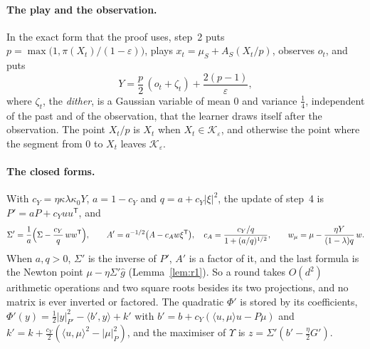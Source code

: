 \documentclass[11pt]{amsart}
\theoremstyle{definition}
\numberwithin{equation}{section}
\newcommand{\cK}{\mathcal{K}}
\newcommand{\ip}[1]{\langle #1\rangle}
\begin{document}
\paragraph{The play and the observation.} In the exact form that the proof uses, step~2 puts $p=\max\bigl(1,\pi(X_t)/(1-\varepsilon)\bigr)$, plays $x_t=\mu_S+A_S(X_t/p)$, observes $o_t$, and puts
\[
Y=\frac p2\,(o_t+\zeta_t)+\frac{2(p-1)}\varepsilon,
\]
where $\zeta_t$, the \emph{dither}, is a Gaussian variable of mean $0$ and variance $\frac14$, independent of the past and of the observation, that the learner draws itself after the observation. The point $X_t/p$ is $X_t$ when $X_t\in\cK_\varepsilon$, and otherwise the point where the segment from $0$ to $X_t$ leaves $\cK_\varepsilon$.

\paragraph{The closed forms.} With $c_Y=\eta\kappa\lambda\kappa_0Y$, $a=1-c_Y$ and $q=a+c_Y|\xi|^2$, the update of step~4 is $P'=aP+c_Yuu^{\mathsf T}$, and
\begin{equation}\label{eq:r1}
\Sigma'=\frac1a\Bigl(\Sigma-\frac{c_Y}q\,ww^{\mathsf T}\Bigr),\qquad A'=a^{-1/2}\bigl(A-c_Aw\xi^{\mathsf T}\bigr),\quad c_A=\frac{c_Y/q}{1+(a/q)^{1/2}},\qquad w_\mu=\mu-\frac{\eta Y}{(1-\lambda)q}\,w .
\end{equation}
When $a,q>0$, $\Sigma'$ is the inverse of $P'$, $A'$ is a factor of it, and the last formula is the Newton point $\mu-\eta\Sigma'\hat g$ (Lemma~\ref{lem:r1}). So a round takes $O(d^2)$ arithmetic operations and two square roots besides its two projections, and no matrix is ever inverted or factored. The quadratic $\Phi'$ is stored by its coefficients, $\Phi'(y)=\frac12|y|^2_{P'}-\ip{b',y}+k'$ with $b'=b+c_Y(\ip{u,\mu}u-P\mu)$ and $k'=k+\frac{c_Y}2(\ip{u,\mu}^2-|\mu|^2_P)$, and the maximiser of $\Upsilon$ is $z=\Sigma'(b'-\frac\eta2G')$.
\end{document}
